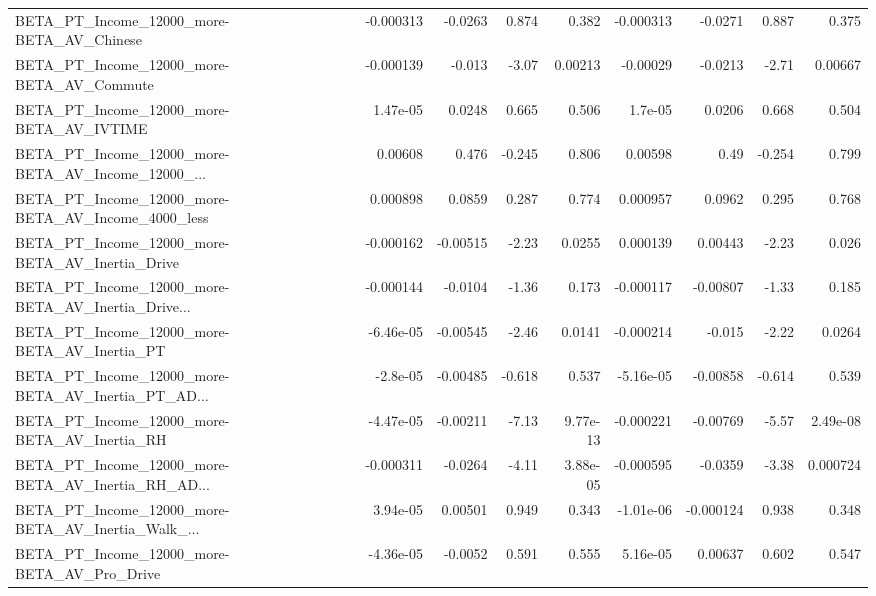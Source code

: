 \begin{tabular}{lrrrrrrrr}
BETA\_PT\_Income\_12000\_more-BETA\_AV\_Chinese          &   -0.000313 &      -0.0263 &    0.874 &    0.382 &  -0.000313 &     -0.0271 &        0.887 &         0.375 \\
BETA\_PT\_Income\_12000\_more-BETA\_AV\_Commute          &   -0.000139 &       -0.013 &    -3.07 &  0.00213 &   -0.00029 &     -0.0213 &        -2.71 &       0.00667 \\
BETA\_PT\_Income\_12000\_more-BETA\_AV\_IVTIME           &    1.47e-05 &       0.0248 &    0.665 &    0.506 &    1.7e-05 &      0.0206 &        0.668 &         0.504 \\
BETA\_PT\_Income\_12000\_more-BETA\_AV\_Income\_12000\_... &     0.00608 &        0.476 &   -0.245 &    0.806 &    0.00598 &        0.49 &       -0.254 &         0.799 \\
BETA\_PT\_Income\_12000\_more-BETA\_AV\_Income\_4000\_less &    0.000898 &       0.0859 &    0.287 &    0.774 &   0.000957 &      0.0962 &        0.295 &         0.768 \\
BETA\_PT\_Income\_12000\_more-BETA\_AV\_Inertia\_Drive    &   -0.000162 &     -0.00515 &    -2.23 &   0.0255 &   0.000139 &     0.00443 &        -2.23 &         0.026 \\
BETA\_PT\_Income\_12000\_more-BETA\_AV\_Inertia\_Drive... &   -0.000144 &      -0.0104 &    -1.36 &    0.173 &  -0.000117 &    -0.00807 &        -1.33 &         0.185 \\
BETA\_PT\_Income\_12000\_more-BETA\_AV\_Inertia\_PT       &   -6.46e-05 &     -0.00545 &    -2.46 &   0.0141 &  -0.000214 &      -0.015 &        -2.22 &        0.0264 \\
BETA\_PT\_Income\_12000\_more-BETA\_AV\_Inertia\_PT\_AD... &    -2.8e-05 &     -0.00485 &   -0.618 &    0.537 &  -5.16e-05 &    -0.00858 &       -0.614 &         0.539 \\
BETA\_PT\_Income\_12000\_more-BETA\_AV\_Inertia\_RH       &   -4.47e-05 &     -0.00211 &    -7.13 & 9.77e-13 &  -0.000221 &    -0.00769 &        -5.57 &      2.49e-08 \\
BETA\_PT\_Income\_12000\_more-BETA\_AV\_Inertia\_RH\_AD... &   -0.000311 &      -0.0264 &    -4.11 & 3.88e-05 &  -0.000595 &     -0.0359 &        -3.38 &      0.000724 \\
BETA\_PT\_Income\_12000\_more-BETA\_AV\_Inertia\_Walk\_... &    3.94e-05 &      0.00501 &    0.949 &    0.343 &  -1.01e-06 &   -0.000124 &        0.938 &         0.348 \\
BETA\_PT\_Income\_12000\_more-BETA\_AV\_Pro\_Drive        &   -4.36e-05 &      -0.0052 &    0.591 &    0.555 &   5.16e-05 &     0.00637 &        0.602 &         0.547 \\

\end{tabular}
